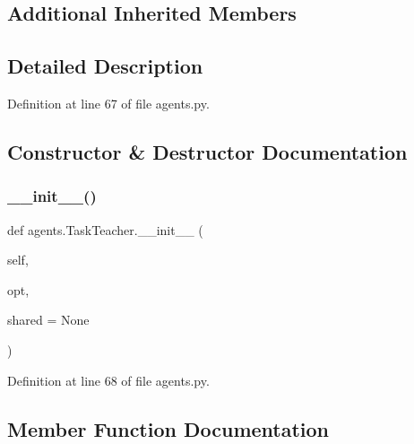 \subsection*{Additional Inherited Members}


\subsection{Detailed Description}


Definition at line 67 of file agents.\+py.



\subsection{Constructor \& Destructor Documentation}
\mbox{\label{classagents_1_1TaskTeacher_aef013b21e09f73914431395efa36686c}} 
\subsubsection{\texorpdfstring{\+\_\+\+\_\+init\+\_\+\+\_\+()}{\_\_init\_\_()}}
{\footnotesize\ttfamily def agents.\+Task\+Teacher.\+\_\+\+\_\+init\+\_\+\+\_\+ (\begin{DoxyParamCaption}\item[{}]{self,  }\item[{}]{opt,  }\item[{}]{shared = {\ttfamily None} }\end{DoxyParamCaption})}



Definition at line 68 of file agents.\+py.



\subsection{Member Function Documentation}
\mbox{\label{classagents_1_1TaskTeacher_aa4657ff478d0f6241272311b3e79351e}} 
